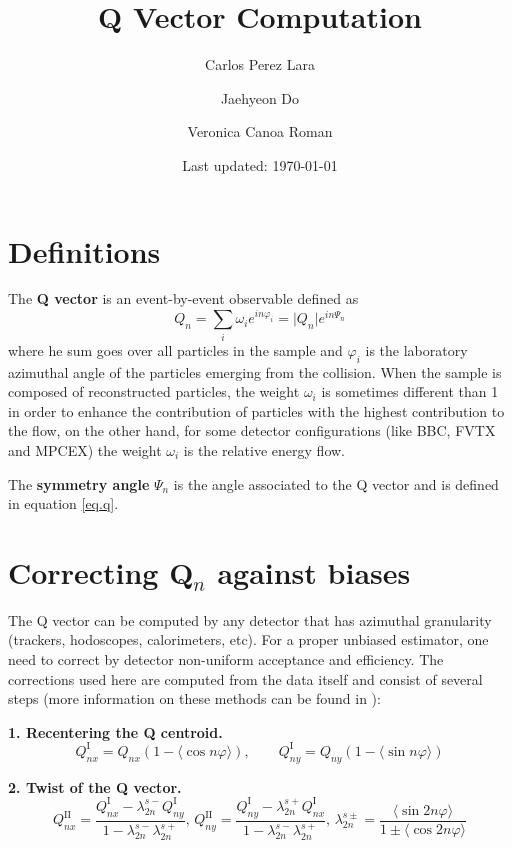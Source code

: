 \documentclass{article}
\title{Q Vector Computation}
\author{Carlos Perez Lara\and Jaehyeon Do \and Veronica Canoa Roman}
\date{Last updated: \today}
\begin{document}
\maketitle

\section{Definitions}
The {\bf Q vector} is an event-by-event observable defined as
\begin{equation}
\label{eq.q}
Q_n = \sum_{i} \omega_i e^{i n\varphi_i} = \vert Q_n \vert e^{i n\Psi_n}
\end{equation}
where he sum goes over all particles in the sample and $\varphi_i$ is the laboratory azimuthal angle of the particles emerging from the collision.
When the sample is composed of reconstructed particles, the weight $\omega_i$  is sometimes different than 1 in order to enhance the contribution of particles with the highest contribution to the flow, on the other hand, for some detector configurations (like BBC, FVTX and MPCEX) the weight $\omega_i$ is the relative energy flow.

The {\bf symmetry angle} $\Psi_n$ is the angle associated to the Q vector and is defined in equation \ref{eq.q}.

\section{Correcting Q$_n$ against biases}
The Q vector can be computed by any detector that has azimuthal granularity (trackers, hodoscopes, calorimeters, etc).
For a proper unbiased estimator, one need to correct by detector non-uniform acceptance and efficiency.
The corrections used here are computed from the data itself and consist of several steps (more information on these methods can be found in \cite{PhysRevC.77.034904,PhysRevC.56.3254}):

{\bf 1. Recentering the Q centroid.}
\begin{equation}
Q^\mathrm{I}_{nx} = Q_{nx}(1-\langle \cos{n\varphi}\rangle), \qquad
Q^\mathrm{I}_{ny} = Q_{ny}(1-\langle \sin{n\varphi}\rangle)
\end{equation}

{\bf 2. Twist of the Q vector.}
\begin{equation}
Q^\mathrm{II}_{nx} = \frac{Q^\mathrm{I}_{nx}-\lambda^{s-}_{2n} Q^\mathrm{I}_{ny}}{1-\lambda^{s-}_{2n}\lambda^{s+}_{2n}}, \,
Q^\mathrm{II}_{ny} = \frac{Q^\mathrm{I}_{ny}-\lambda^{s+}_{2n} Q^\mathrm{I}_{nx}}{1-\lambda^{s-}_{2n}\lambda^{s+}_{2n}}, \,
\lambda^{s\pm}_{2n}=\frac{\langle\sin{2n\varphi}\rangle}{1\pm\langle\cos{2n\varphi}\rangle}
\end{equation}
\end{document}

